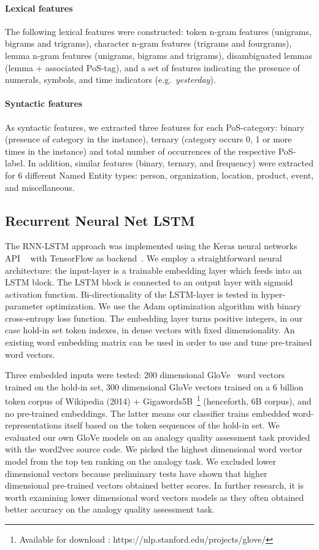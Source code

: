 \documentclass[11pt,a4paper]{article}
\begin{document}
\paragraph{Lexical features} 
The following lexical features were constructed: token n-gram features (unigrams, bigrams and trigrams), character n-gram features (trigrams and fourgrams), lemma n-gram features (unigrams, bigrams and trigrams), disambiguated lemmas (lemma + associated PoS-tag), and a set of features indicating the presence of numerals, symbols, and time indicators (e.g.~\emph{yesterday}).

\paragraph{Syntactic features}
As syntactic features, we extracted three features for each PoS-category: binary (presence of category in the instance), ternary (category occurs 0, 1 or more times in the instance) and total number of occurrences of the respective PoS-label. In addition, similar features (binary, ternary, and frequency) were extracted for 6 different Named Entity types: person, organization, location, product, event, and miscellaneous.  

\subsection{Recurrent Neural Net LSTM}
The RNN-LSTM approach was implemented using the Keras neural networks API ~\cite{chollet2015keras} with TensorFlow as backend~\cite{tensorflow2015whitepaper}. We employ a straightforward neural architecture: the input-layer is a trainable embedding layer which feeds into an LSTM block. The LSTM block is connected to an output layer with sigmoid activation function.
Bi-directionality of the LSTM-layer is tested in hyper-parameter optimization.
We use the Adam optimization algorithm with binary cross-entropy loss function.
The embedding layer turns positive integers, in our case hold-in set token indexes, in dense vectors with fixed dimensionality.
An existing word embedding matrix can be used in order to use and tune pre-trained word vectors.

Three embedded inputs were tested: 200 dimensional GloVe~\cite{pennington2014glove} word vectors trained on the hold-in set, 300 dimensional GloVe vectors trained on a 6 billion token corpus of Wikipedia (2014) + Gigawords5B~\footnote{Available for download : https://nlp.stanford.edu/projects/glove/} (henceforth, 6B corpus), and no pre-trained embeddings.
The latter means our classifier trains embedded word-representations itself based on the token sequences of the hold-in set.
We evaluated our own GloVe models on an analogy quality assessment task provided with the word2vec source code.
We picked the highest dimensional word vector model from the top ten ranking on the analogy task.
We excluded lower dimensional vectors because preliminary tests have shown that higher dimensional pre-trained vectors obtained better scores.
In further research, it is worth examining lower dimensional word vectors models as they often obtained better accuracy on the analogy quality assessment task.
\end{document}
